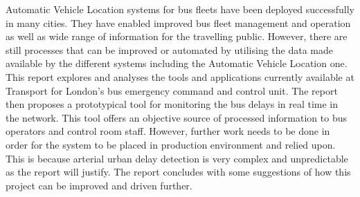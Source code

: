 Automatic Vehicle Location systems for bus fleets have been deployed successfully in many cities. They have enabled improved bus fleet management and operation as well as wide range of information for the travelling public. However, there are still processes that can be improved or automated by utilising the data made available by the different systems including the Automatic Vehicle Location one. This report explores and analyses the tools and applications currently available at Transport for London's bus emergency command and control unit. The report then proposes a prototypical tool for monitoring the bus delays in real time in the network. This tool offers an objective source of processed information to bus operators and control room staff. However, further work needs to be done in order for the system to be placed in production environment and relied upon. This is because arterial urban delay detection is very complex and unpredictable as the report will justify. The report concludes with some suggestions of how this project can be improved and driven further.





